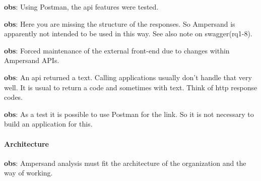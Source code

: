 \begin{obs}\label{obs:rq1-72:14-11}
    \textbf{obs}: Using Postman, the api features were tested.
\end{obs}
    
\begin{obs}\label{obs:rq1-73:14-11}
    \textbf{obs}: Here you are missing the structure of the responses.
    So Ampersand is apparently not intended to be used in this way.
    See also note on swagger(rq1-8).
\end{obs}
    
\begin{obs}\label{obs:rq1-74:16-11}
    \textbf{obs}: Forced maintenance of the external front-end due to changes within Ampersand APIs.
\end{obs}

\begin{obs}\label{obs:rq4-2}
    \textbf{obs}: An api returned a text.
    Calling applications usually don't handle that very well.
    It is usual to return a code and sometimes with text.
    Think of http response codes.
\end{obs}

\begin{obs}\label{obs:rq4-5}
    \textbf{obs}: As a test it is possible to use Postman for the link.
    So it is not necessary to build an application for this.
\end{obs}

\paragraph{Architecture}
\begin{obs}\label{obs:rq1-62:10-11}
    \textbf{obs}: Ampersand analysis must fit the architecture of the organization and the way of working.
\end{obs}

